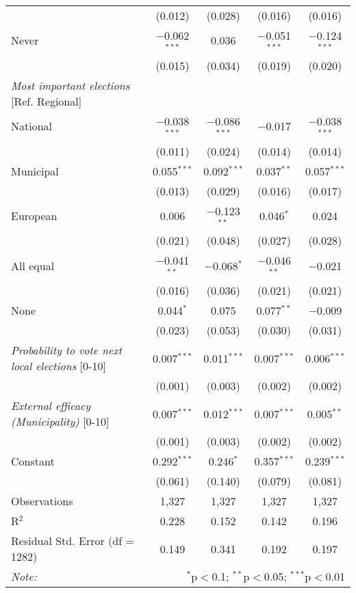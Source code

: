 \documentclass[12pt,a4paper]{article}
\begin{document}
\begin{scriptsize}
\begin{longtable}{lcccc}
    & (0.012) & (0.028) & (0.016) & (0.016) \\ 
Never   & $-$0.062$^{***}$ & 0.036 & $-$0.051$^{***}$ & $-$0.124$^{***}$ \\ 
    & (0.015) & (0.034) & (0.019) & (0.020) \\ 
{\it Most important elections} [Ref. Regional]\\
National   & $-$0.038$^{***}$ & $-$0.086$^{***}$ & $-$0.017 & $-$0.038$^{***}$ \\ 
    & (0.011) & (0.024) & (0.014) & (0.014) \\ 
Municipal   & 0.055$^{***}$ & 0.092$^{***}$ & 0.037$^{**}$ & 0.057$^{***}$ \\ 
    & (0.013) & (0.029) & (0.016) & (0.017) \\ 
European   & 0.006 & $-$0.123$^{**}$ & 0.046$^{*}$ & 0.024 \\ 
    & (0.021) & (0.048) & (0.027) & (0.028) \\ 
All equal   & $-$0.041$^{**}$ & $-$0.068$^{*}$ & $-$0.046$^{**}$ & $-$0.021 \\ 
    & (0.016) & (0.036) & (0.021) & (0.021) \\ 
None   & 0.044$^{*}$ & 0.075 & 0.077$^{**}$ & $-$0.009 \\ 
    & (0.023) & (0.053) & (0.030) & (0.031) \\ 
{\it Probability to vote next local elections} [0-10]   & 0.007$^{***}$ & 0.011$^{***}$ & 0.007$^{***}$ & 0.006$^{***}$ \\ 
    & (0.001) & (0.003) & (0.002) & (0.002) \\ 
{\it External efficacy (Municipality)} [0-10]   & 0.007$^{***}$ & 0.012$^{***}$ & 0.007$^{***}$ & 0.005$^{**}$ \\ 
    & (0.001) & (0.003) & (0.002) & (0.002) \\ 
  Constant  & 0.292$^{***}$ & 0.246$^{*}$ & 0.357$^{***}$ & 0.239$^{***}$ \\ 
 & (0.061) & (0.140) & (0.079) & (0.081) \\ 
 \midrule %
Observations & 1,327 & 1,327 & 1,327 & 1,327 \\ 
R$^{2}$ & 0.228 & 0.152 & 0.142 & 0.196 \\ 
Residual Std. Error (df = 1282)  & 0.149 & 0.341 & 0.192 & 0.197 \\ 
\bottomrule %
\textit{Note:}  & \multicolumn{4}{r}{$^{*}$p$<$0.1; $^{**}$p$<$0.05; $^{***}$p$<$0.01} \\ 
\end{longtable}
\end{scriptsize}
\end{document}
